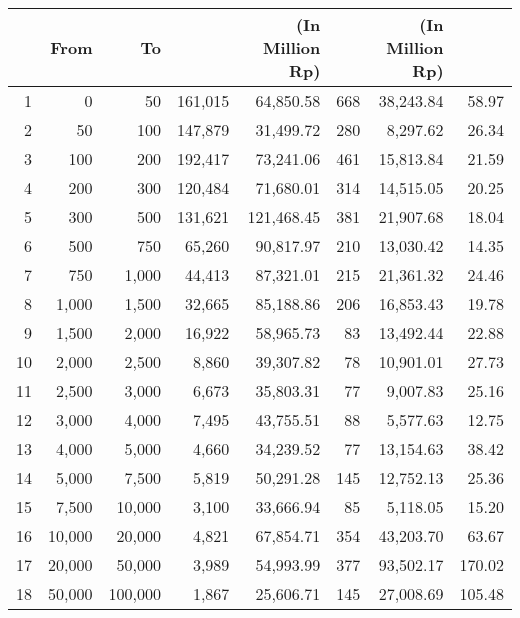 \documentclass[12pt,letterpaper]{article}
\begin{document}
\begin{table}[h]
\begin{center}
\begin{tabular}{rrrrrrrr}
     & {From} &   {To} & & {(In Million Rp)} & & { (In Million Rp)}  \\
\hline
         1 &          0 &         50 &   161,015 & 64,850.58 &       668 & 38,243.84 &     58.97 \\
         2 &         50 &        100 &   147,879 & 31,499.72 &       280 &  8,297.62 &     26.34 \\
\hline
         3 &        100 &        200 &   192,417 & 73,241.06 &       461 & 15,813.84 &     21.59 \\
         4 &        200 &        300 &   120,484 & 71,680.01 &       314 & 14,515.05 &     20.25 \\
         5 &        300 &        500 &   131,621 & 121,468.45 &       381 & 21,907.68 &     18.04 \\
         6 &        500 &        750 &    65,260 & 90,817.97 &       210 & 13,030.42 &     14.35 \\
         7 &        750 &      1,000 &    44,413 & 87,321.01 &       215 & 21,361.32 &     24.46 \\
\hline
         8 &      1,000 &      1,500 &    32,665 & 85,188.86 &       206 & 16,853.43 &     19.78 \\
         9 &      1,500 &      2,000 &    16,922 & 58,965.73 &        83 & 13,492.44 &     22.88 \\
        10 &      2,000 &      2,500 &     8,860 & 39,307.82 &        78 & 10,901.01 &     27.73 \\
        11 &      2,500 &      3,000 &     6,673 & 35,803.31 &        77 &  9,007.83 &     25.16 \\
        12 &      3,000 &      4,000 &     7,495 & 43,755.51 &        88 &  5,577.63 &     12.75 \\
        13 &      4,000 &      5,000 &     4,660 & 34,239.52 &        77 & 13,154.63 &     38.42 \\
\hline
        14 &      5,000 &      7,500 &     5,819 & 50,291.28 &       145 & 12,752.13 &     25.36 \\
        15 &      7,500 &     10,000 &     3,100 & 33,666.94 &        85 &  5,118.05 &     15.20 \\
        16 &     10,000 &     20,000 &     4,821 & 67,854.71 &       354 & 43,203.70 &     63.67 \\
        17 &     20,000 &     50,000 &     3,989 & 54,993.99 &       377 & 93,502.17 &    170.02 \\
\hline
        18 &     50,000 &    100,000 &     1,867 & 25,606.71 &       145 & 27,008.69 &    105.48 \\

\end{tabular}
\end{center}
\end{table}
\end{document}
